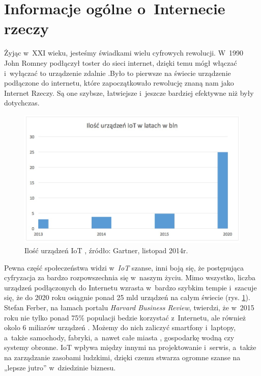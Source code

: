 \documentclass{xmgr}
\begin{document}
\section{Informacje ogólne o~Internecie rzeczy}
	Żyjąc w~XXI wieku, jesteśmy świadkami wielu cyfrowych rewolucji. W~1990 John Romney podłączył toster do sieci internet, dzięki temu mógł włączać i~wyłączać to urządzenie zdalnie \cite{toster}.Było to pierwsze na świecie urządzenie podłączone do internetu, które zapoczątkowało rewolucję znaną nam jako Internet Rzeczy. Są one szybsze, łatwiejsze i~jeszcze bardziej efektywne niż były dotychczas. 
\begin{figure}[h]
\centering
\includegraphics[width=\textwidth]{w}
\caption{Ilość urządzeń IoT , źródło: Gartner, listopad 2014r.}
\label{fig:ilosciot}
\end{figure}
\clearpage
	Pewna część społeczeństwa widzi w~\emph{IoT} szanse, inni boją się, że postępująca cyfryzacja za bardzo rozpowszechnia się w~naszym życiu. Mimo wszystko, liczba urządzeń podłączonych do Internetu wzrasta w~bardzo szybkim tempie i~szacuje się, że do 2020 roku osiągnie ponad 25 mld urządzeń na całym świecie (rys. \ref{fig:ilosciot}).
	Stefan Ferber, na łamach portalu \emph{Harvard Business Review}, twierdzi, że w~2015 roku nie tylko ponad 75\% populacji bedzie korzystać z~Internetu, ale również okolo 6 miliarów urządzeń \cite{harvard}. Możemy do nich zaliczyć smartfony i~laptopy, a~także samochody, fabryki, a~nawet całe miasta \cite{miasta}, gospodarkę wodną czy systemy obronne. IoT wpływa między innymi na projektowanie i~serwis, a~także na zarządzanie zasobami ludzkimi, dzięki czemu stwarza ogromne szanse na „lepsze jutro” w~dziedzinie biznesu. 
\end{document}
